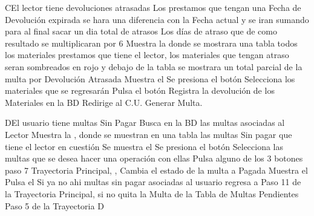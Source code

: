 		\begin{UCtrayectoriaA}{C}{El lector tiene devoluciones atrasadas}
			\UCpaso[\UCsist] Los prestamos que tengan una Fecha de Devolución expirada se hara una diferencia con la Fecha actual y se iran sumando para al final sacar un dia total de atrasos
			\UCpaso[\UCsist] Los días de atraso que de como resultado se multiplicaran por 6
			\UCpaso[\UCsist] Muestra la  donde se mostrara una tabla todos los materiales prestamos que tiene el lector, los materiales que tengan atraso seran sombreados en rojo y debajo de la tabla se mostrara un total parcial de la multa por Devolución Atrasada
			\UCpaso[\UCsist] Muestra el 
			\UCpaso[\UCactor] Se presiona el botón 
			\UCpaso[\UCactor]	Selecciona los materiales que se regresarán
			\UCpaso[\UCactor]	Pulsa el botón 
			\UCpaso[\UCsist]	Registra la devolución de los Materiales en la BD
			\UCpaso[\UCsist]	Redirige al C.U. Generar Multa.
		\end{UCtrayectoriaA}	
		\begin{UCtrayectoriaA}{D}{El usuario tiene multas Sin Pagar}
			\UCpaso[\UCsist] Busca en la BD las multas asociadas al Lector
			\UCpaso[\UCsist] Muestra la , donde se muestran en una tabla las multas Sin pagar que tiene el lector en cuestión
			\UCpaso[\UCsist] Se muestra el 
			\UCpaso[\UCactor] Se presiona el botón 
			\UCpaso[\UCactor] Selecciona las multas que se desea hacer una operación con ellas
			\UCpaso[\UCactor] Pulsa alguno de los 3 botones  paso 7 Trayectoria Principal,  ,  
			\UCpaso[\UCsist] Cambia el estado de la multa a Pagada
			\UCpaso[\UCsist] Muestra el 
			\UCpaso[\UCactor] Pulsa el 
			\UCpaso[\UCsist] Si ya no ahi multas sin pagar asociadas al usuario regresa a Paso 11 de la Trayectoria Principal, si no quita la Multa de la Tabla de Multas Pendientes Paso 5 de la Trayectoria D
		\end{UCtrayectoriaA}
